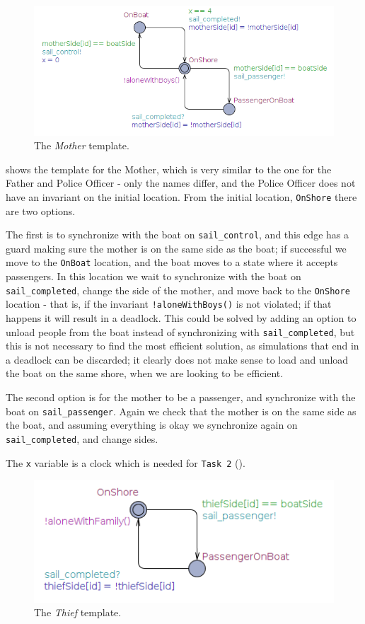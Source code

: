 \begin{figure}[H] \centering
	\includegraphics[width=.9\textwidth]{Images/mom.png}
	\caption{The \textit{Mother} template.}\label{fig:mother}
\end{figure} 

\noindent {} shows the template for the Mother, which is very similar to the one for the Father and Police Officer - only the names differ, and the Police Officer does not have an invariant on the initial location. From the initial location, \texttt{OnShore} there are two options.

The first is to synchronize with the boat on \texttt{sail_control}, and this edge has a guard making sure the mother is on the same side as the boat; if successful we move to the \texttt{OnBoat} location, and the boat moves to a state where it accepts passengers. In this location we wait to synchronize with the boat on \texttt{sail_completed}, change the side of the mother, and move back to the \texttt{OnShore} location - that is, if the invariant \texttt{!aloneWithBoys()} is not violated; if that happens it will result in a deadlock. This could be solved by adding an option to unload people from the boat instead of synchronizing with \texttt{sail_completed}, but this is not necessary to find the most efficient solution, as simulations that end in a deadlock can be discarded; it clearly does not make sense to load and unload the boat on the same shore, when we are looking to be efficient. 

The second option is for the mother to be a passenger, and synchronize with the boat on \texttt{sail_passenger}. Again we check that the mother is on the same side as the boat, and assuming everything is okay we synchronize again on \texttt{sail_completed}, and change sides.

The \texttt{x} variable is a clock which is needed for \texttt{Task 2} ().

\begin{figure}[H] \centering
	\includegraphics[width=.7\textwidth]{Images/thief.png}
	\caption{The \textit{Thief} template.}\label{fig:thief}
\end{figure} 

